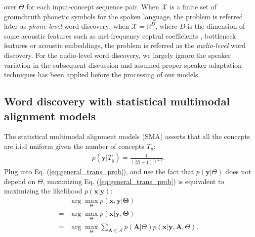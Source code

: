 \documentclass[journal]{IEEEtran}
\newcommand{\reals}{\mathbb R}
\begin{document}
over $\Theta$ for each input-concept sequence pair. When $\mathcal X$ is a finite set of groundtruth phonetic symbols for the spoken language, the problem is referred later as \textit{phone-level} word discovery; when $\mathcal X = \reals^{D}$, where $D$ is the dimension of some acoustic features such as mel-frequency ceptral coefficients \cite{Davis1980}, bottleneck features \cite{Roweis1997, Fer2017} or acoustic embeddings, the problem is referred as the \textit{audio-level} word discovery. For the audio-level word discovery, we largely ignore the speaker variation in the subsequent discussion and assumed proper speaker adaptation techniques has been applied before the processing of our models.

\subsection{Word discovery with statistical multimodal alignment models}
 The statistical multimodal alignment models (SMA) asserts that all the concepts are i.i.d uniform given the number of concepts $T_y$:
 \begin{align}\label{eq:smt_concept_prior}
     p(\mathbf y|T_y) = \frac{1}{(|\mathcal Y|+1)^{T_y+1}}.
 \end{align}
Plug into Eq. (\ref{eq:general_trans_prob}), and use the fact that $p(\mathbf y|\Theta)$ does not depend on $\Theta$, maximizing Eq. (\ref{eq:general_trans_prob}) is equivalent to maximizing the likelihood $p(\mathbf{x}|\mathbf{y})$:
\begin{align}\label{eq:smt_trans_prob}
    &\arg \max_{\Theta} p(\mathbf{x},\mathbf{y}|\mathbf \Theta)\nonumber\\ 
    =& \arg \max_{\Theta}
    p(\mathbf{x}|\mathbf y, \mathbf \Theta)\nonumber\\
    =& \arg \max_{\Theta} \sum_{\mathbf{A} \in \mathcal A} p(\mathbf{A}|\Theta) p(\mathbf{x}| \mathbf{y}, \mathbf{A}, \Theta).
\end{align}
\end{document}
